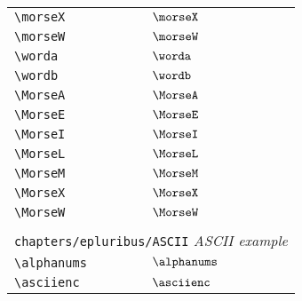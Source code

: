 \begin{longtable}{lll}
  {\color[rgb]{0.5,0.5,0.5}\texttt{\textbackslash morseX}}                                                  & $\morseX$                  & \\
  {\color[rgb]{0.5,0.5,0.5}\texttt{\textbackslash morseW}}                                                  & $\morseW$                  & \\
  {\color[rgb]{0.5,0.5,0.5}\texttt{\textbackslash worda}}                                                   & $\worda$                   & \\
  {\color[rgb]{0.5,0.5,0.5}\texttt{\textbackslash wordb}}                                                   & $\wordb$                   & \\
  {\color[rgb]{0.5,0.5,0.5}\texttt{\textbackslash MorseA}}                                                  & $\MorseA$                  & \\
  {\color[rgb]{0.5,0.5,0.5}\texttt{\textbackslash MorseE}}                                                  & $\MorseE$                  & \\
  {\color[rgb]{0.5,0.5,0.5}\texttt{\textbackslash MorseI}}                                                  & $\MorseI$                  & \\
  {\color[rgb]{0.5,0.5,0.5}\texttt{\textbackslash MorseL}}                                                  & $\MorseL$                  & \\
  {\color[rgb]{0.5,0.5,0.5}\texttt{\textbackslash MorseM}}                                                  & $\MorseM$                  & \\
  {\color[rgb]{0.5,0.5,0.5}\texttt{\textbackslash MorseX}}                                                  & $\MorseX$                  & \\
  {\color[rgb]{0.5,0.5,0.5}\texttt{\textbackslash MorseW}}                                                  & $\MorseW$                  &                                                         \\
  &                            &                                                         \\
  \multicolumn{3}{l}{{\color[rgb]{0.5,0.5,0.5}\texttt{chapters/epluribus/ASCII}} \emph{ASCII example}}
  \\
  \hline
  {\color[rgb]{0.5,0.5,0.5}\texttt{\textbackslash alphanums}}                                               & $\alphanums$               & \\
  {\color[rgb]{0.5,0.5,0.5}\texttt{\textbackslash asciienc}}                                                & $\asciienc$                & \\

\end{longtable}
